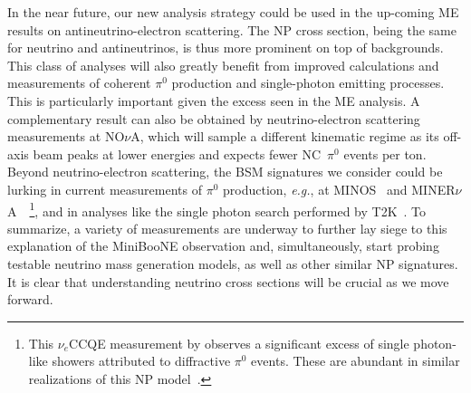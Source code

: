 In the near future, our new analysis strategy could be used in the up-coming \minerva ME results on antineutrino-electron scattering. The NP cross section, being the same for neutrino and antineutrinos, is thus more prominent on top of backgrounds.
This class of analyses will also greatly benefit from improved calculations and measurements of coherent $\pi^0$ production and single-photon emitting processes. This is particularly important given the excess seen in the \minerva ME analysis.
A complementary result can also be obtained by neutrino-electron scattering measurements at NO$\nu$A, which will sample a different kinematic regime as its off-axis beam peaks at lower energies and expects fewer NC~$\pi^0$ events per ton.
Beyond neutrino-electron scattering, the BSM signatures we consider could be lurking in current measurements of $\pi^0$ production, \textit{e.g.}, at MINOS~\cite{Adamson:2016hyz} and MINER$\nu$A~\cite{Wolcott:2016hws}~\footnote{This $\nu_e$CCQE measurement by \minerva observes a significant excess of single photon-like showers attributed to diffractive $\pi^0$ events. These are abundant in similar realizations of this NP model~\cite{Ballett:2018ynz}.}, and in analyses like the single photon search performed by T2K~\cite{Abe:2019cer}.
To summarize, a variety of measurements are underway to further lay siege to this explanation of the MiniBooNE observation and, simultaneously, start probing testable neutrino mass generation models, as well as other similar NP signatures. It is clear that understanding neutrino cross sections will be crucial as we move forward.
